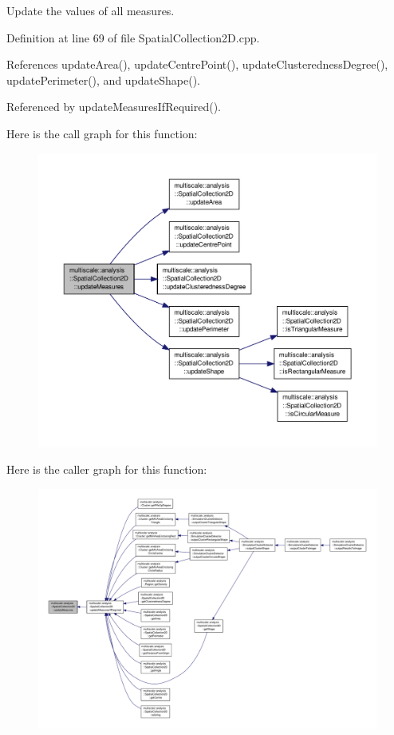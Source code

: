 Update the values of all measures. 



Definition at line 69 of file Spatial\-Collection2\-D.\-cpp.



References update\-Area(), update\-Centre\-Point(), update\-Clusteredness\-Degree(), update\-Perimeter(), and update\-Shape().



Referenced by update\-Measures\-If\-Required().



Here is the call graph for this function\-:
\nopagebreak
\begin{figure}[H]
\begin{center}
\leavevmode
\includegraphics[width=350pt]{classmultiscale_1_1analysis_1_1SpatialCollection2D_a8e5a2af581895142da9b50eeeabeb7be_cgraph}
\end{center}
\end{figure}




Here is the caller graph for this function\-:
\nopagebreak
\begin{figure}[H]
\begin{center}
\leavevmode
\includegraphics[width=350pt]{classmultiscale_1_1analysis_1_1SpatialCollection2D_a8e5a2af581895142da9b50eeeabeb7be_icgraph}
\end{center}
\end{figure}


